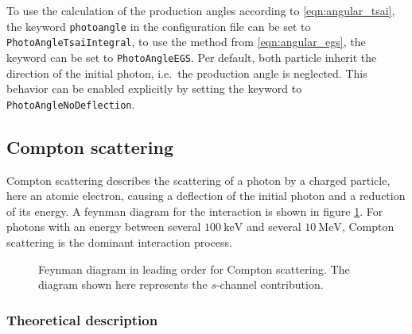 \begin{sloppypar}
To use the calculation of the production angles according to \eqref{eqn:angular_tsai}, the keyword \texttt{photoangle} in the configuration file can be set to \texttt{PhotoAngleTsaiIntegral}, to use the method from \eqref{eqn:angular_egs}, the keyword can be set to \texttt{PhotoAngleEGS}.
Per default, both particle inherit the direction of the initial photon, i.e.\ the production angle is neglected.
This behavior can be enabled explicitly by setting the keyword to \texttt{PhotoAngleNoDeflection}.
\end{sloppypar}

\subsection{Compton scattering}

Compton scattering describes the scattering of a photon by a charged particle, here an atomic electron, causing a deflection of the initial photon and a reduction of its energy.
A feynman diagram for the interaction is shown in figure \ref{fig:feynman_compton}.
For photons with an energy between several $\SI{100}{\kilo\electronvolt}$ and several $\SI{10}{\mega\electronvolt}$, Compton scattering is the dominant interaction process.

\begin{figure}
    \centering
    
    \caption{Feynman diagram in leading order for Compton scattering. The diagram shown here represents the $s$-channel contribution.}
    \label{fig:feynman_compton}
\end{figure}


\subsubsection{Theoretical description}

